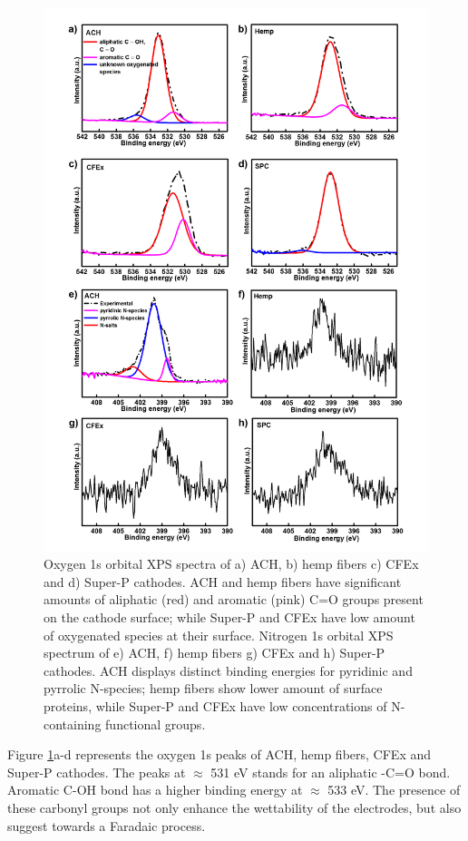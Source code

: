 \documentclass{article}
\begin{document}
\begin{figure}[tbh!]
  \centering
  \includegraphics[width=\textwidth]{figures/XPSON}
    \caption{Oxygen 1s orbital XPS spectra of a) ACH, b) hemp fibers c) CFEx and d) Super-P cathodes. ACH and hemp fibers have significant amounts of aliphatic (red) and aromatic (pink) C=O groups present on the cathode surface; while Super-P and CFEx have low amount of oxygenated species at their surface. Nitrogen 1s orbital XPS spectrum of e) ACH, f) hemp fibers g) CFEx and h) Super-P cathodes. ACH displays distinct binding energies for pyridinic and pyrrolic N-species; hemp fibers show lower amount of surface proteins, while Super-P and CFEx have low concentrations of N-containing functional groups.}
  \label{figures:XPSON}
\end{figure}
Figure \ref{figures:XPSON}a-d represents the oxygen 1s peaks of ACH, hemp fibers, CFEx and Super-P cathodes. The peaks at $\approx$ 531 eV stands for an aliphatic -C=O bond. Aromatic C-OH bond has a higher binding energy at $\approx$ 533 eV. The presence of these carbonyl groups not only enhance the wettability of the electrodes, but also suggest towards a Faradaic process\cite{taberna_electrode_2006}. 
\end{document}
